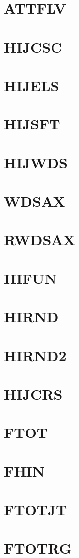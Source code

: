 \documentclass[14pt,UTF8]{ctexbook}
\begin{document}
\section{ATTFLV}
\section{HIJCSC}
\section{HIJELS}
\section{HIJSFT}
\section{HIJWDS}
\section{WDSAX}
\section{RWDSAX}
\section{HIFUN}
\section{HIRND}
\section{HIRND2}
\section{HIJCRS}
\section{FTOT}
\section{FHIN}
\section{FTOTJT}
\section{FTOTRG}
\end{document}

